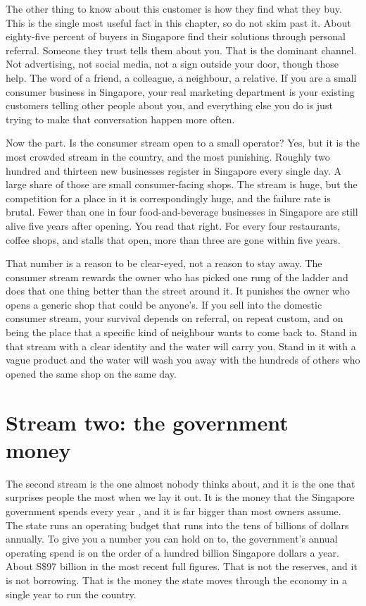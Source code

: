 \documentclass[10pt,twoside,openany]{memoir}
\newcommand{\needspacehead}{\needspace{4\baselineskip}}
\let\oldsection\section
\renewcommand{\section}{\needspacehead\oldsection}
\begin{document}
{{{{{{{{{{{{{{The other thing to know about this customer is how they find what they
buy. This is the single most useful fact in this chapter, so do not skim
past it. About eighty-five percent of buyers in Singapore find their
solutions through personal referral. Someone they trust tells them about
you. That is the dominant channel. Not advertising, not social media,
not a sign outside your door, though those help. The word of a friend, a
colleague, a neighbour, a relative. If you are a small consumer business
in Singapore, your real marketing department is your existing customers
telling other people about you, and everything else you do is just
trying to make that conversation happen more often.

Now the part. Is the consumer stream open to a small operator? Yes, but
it is the most crowded stream in the country, and the most punishing.
Roughly two hundred and thirteen new businesses register in Singapore
every single day. A large share of those are small consumer-facing
shops. The stream is huge, but the competition for a place in it is
correspondingly huge, and the failure rate is brutal. Fewer than one in
four food-and-beverage businesses in Singapore are still alive five
years after opening. You read that right. For every four restaurants,
coffee shops, and stalls that open, more than three are gone within five
years.

That number is a reason to be clear-eyed, not a reason to stay away. The
consumer stream rewards the owner who has picked one rung of the ladder
and does that one thing better than the street around it. It punishes
the owner who opens a generic shop that could be anyone's. If you sell
into the domestic consumer stream, your survival depends on referral, on
repeat custom, and on being the place that a specific kind of neighbour
wants to come back to. Stand in that stream with a clear identity and
the water will carry you. Stand in it with a vague product and the water
will wash you away with the hundreds of others who opened the same shop
on the same day.

\section{Stream two: the government
money}\label{stream-two-the-government-money}

The second stream is the one almost nobody thinks about, and it is the
one that surprises people the most when we lay it out. It is the money
that the Singapore government spends every year
\cite{singstat-publicfinance}, and it is far bigger than most owners
assume. The state runs an operating budget that runs into the tens of
billions of dollars annually. To give you a number you can hold on to,
the government's annual operating spend is on the order of a hundred
billion Singapore dollars a year. About S\$97 billion in the most recent
full figures. That is not the reserves, and it is not borrowing. That is
the money the state moves through the economy in a single year to run
the country.

}}}}}}}}}}}}}}
\end{document}

